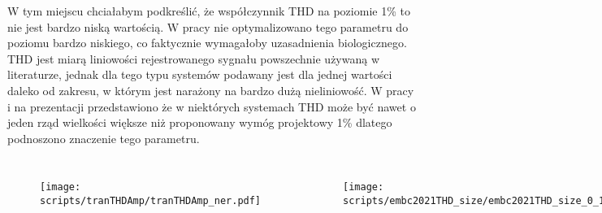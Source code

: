 \begin{frame}[t]
    \vspace{-1em}

\begin{block}{\dk}
\end{block}

{\renewcommand\normalsize{\small}%
\normalsize
W tym miejscu chciałabym podkreślić, że współczynnik THD na poziomie 1\% to nie jest bardzo niską wartością. W pracy nie optymalizowano tego parametru do poziomu bardzo niskiego, co faktycznie wymagałoby uzasadnienia biologicznego. THD jest miarą liniowości rejestrowanego sygnału powszechnie używaną w literaturze, jednak dla tego typu systemów podawany jest dla jednej wartości daleko od zakresu, w którym jest narażony na bardzo dużą nieliniowość. W pracy i na prezentacji przedstawiono że w niektórych systemach THD może być nawet o jeden rząd wielkości większe niż proponowany wymóg projektowy 1\% dlatego podnoszono znaczenie tego parametru.


}
\vspace{-1em}

\begin{columns}

    \begin{figure}[H]
        \centering
            \texttt{[image: scripts/tranTHDAmp/tranTHDAmp\_ner.pdf]}
    \end{figure}   

    \begin{figure}[H]
        \centering
        \texttt{[image: scripts/embc2021THD\_size/embc2021THD\_size\_0\_100.pdf]}
    \end{figure}   

    \begin{figure}[H]
        \centering
        \texttt{[image: ch1/lfp\_ap\_spectrum]}  
        \end{figure}	

\end{columns}



\end{frame}



